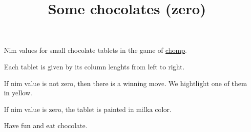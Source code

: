\documentclass{article}
\title{Some chocolates (zero)}
\date{}
\begin{document}
\maketitle
\vspace{-30}
{
    \centering
    Nim values for small chocolate tablets in the game of {\color{blue}\href{https://en.wikipedia.org/wiki/Chomp}{chomp}}.

    Each tablet is given by its column lenghts from left to right.

    If nim value is not zero, then there is a winning move. We hightlight one of them in yellow.

    If nim value is zero, the tablet is painted in milka color.

    Have fun and eat chocolate.

}

\vspace{20}
\end{document}
